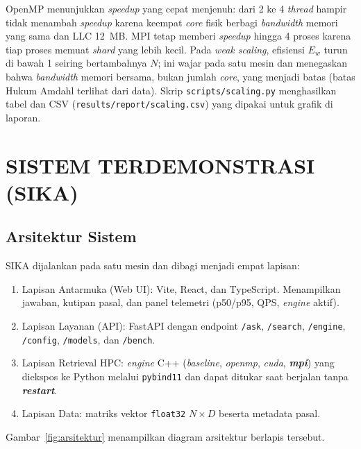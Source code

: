 \documentclass[12pt,a4paper,oneside]{report}
\newcommand{\keyword}[1]{\textbf{\textit{#1}}}
\begin{document}
OpenMP menunjukkan \textit{speedup} yang cepat menjenuh: dari 2 ke 4 \textit{thread} hampir tidak menambah \textit{speedup} karena keempat \textit{core} fisik berbagi \textit{bandwidth} memori yang sama dan LLC 12~MB. MPI tetap memberi \textit{speedup} hingga 4 proses karena tiap proses memuat \textit{shard} yang lebih kecil. Pada \textit{weak scaling}, efisiensi $E_w$ turun di bawah 1 seiring bertambahnya $N$; ini wajar pada satu mesin dan menegaskan bahwa \textit{bandwidth} memori bersama, bukan jumlah \textit{core}, yang menjadi batas (batas Hukum Amdahl terlihat dari data). Skrip \texttt{scripts/scaling.py} menghasilkan tabel dan CSV (\texttt{results/report/scaling.csv}) yang dipakai untuk grafik di laporan.

\chapter{SISTEM TERDEMONSTRASI (SIKA)}

\section{Arsitektur Sistem}

SIKA dijalankan pada satu mesin dan dibagi menjadi empat lapisan:
\begin{enumerate}[leftmargin=2em]
  \item Lapisan Antarmuka (Web UI): Vite, React, dan TypeScript. Menampilkan jawaban, kutipan pasal, dan panel telemetri (p50/p95, QPS, \textit{engine} aktif).
  \item Lapisan Layanan (API): FastAPI dengan endpoint \texttt{/ask}, \texttt{/search}, \texttt{/engine}, \texttt{/config}, \texttt{/models}, dan \texttt{/bench}.
  \item Lapisan Retrieval HPC: \textit{engine} C++ (\textit{baseline}, \textit{openmp}, \textit{cuda}, \keyword{mpi}) yang diekspos ke Python melalui \texttt{pybind11} dan dapat ditukar saat berjalan tanpa \keyword{restart}.
  \item Lapisan Data: matriks vektor \texttt{float32} $N \times D$ beserta metadata pasal.
\end{enumerate}

Gambar~\ref{fig:arsitektur} menampilkan diagram arsitektur berlapis tersebut.
\end{document}
